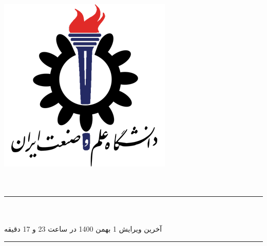 \begin{titlepage}
    \centering
    \includegraphics[scale = 0.5]{Images/IUSTLogo.png}\\
    \Huge{\Faculty}\\[0.2 cm]
    \huge{\Course}\\[0.2 cm]
    \LARGE{\Semester}
    
    \rule{\linewidth}{1.0 mm}
    \huge{\Subject}\\[0.2 cm]
    \LARGE{\Title}\\[0.4 cm]
    \large{آخرین ویرایش 1 بهمن 1400 در ساعت 23 و 17 دقیقه}
    \rule{\linewidth}{1.0 mm}\\[1.0 cm]
    
    \LARGE
    \begin{minipage}{0.95 \textwidth}
        \centering
	    \Prof \dotfill \prof\\[0.15 cm]
	    \Members \dotfill \members\\[0.15 cm]
	    \SID \dotfill \sid\\[0.15 cm]
	\end{minipage}

\end{titlepage}